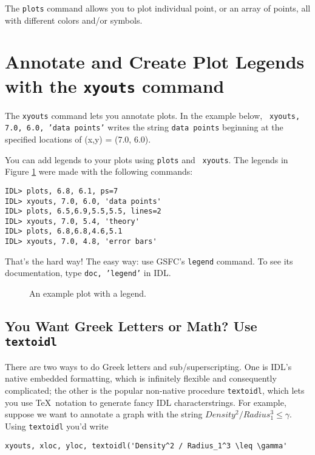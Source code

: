 \documentclass[preprint]{aastex}
\begin{document}
The {\tt plots} command allows you to plot individual point, or an array
of points, all with different colors and/or symbols.

\section{Annotate and Create Plot Legends with the {\tt xyouts} command}

The {\tt xyouts} command lets you annotate plots. In the example below, {\tt
xyouts, 7.0, 6.0, 'data points'} writes the string {\tt data points}
beginning at the specified locations of (x,y) = (7.0, 6.0).

You can add legends to your plots using {\tt plots} and {\tt
xyouts}.  The legends in Figure \ref{ex4} were made with the following
commands:

\begin{verbatim}
IDL> plots, 6.8, 6.1, ps=7
IDL> xyouts, 7.0, 6.0, 'data points'
IDL> plots, 6.5,6.9,5.5,5.5, lines=2
IDL> xyouts, 7.0, 5.4, 'theory'
IDL> plots, 6.8,6.8,4.6,5.1
IDL> xyouts, 7.0, 4.8, 'error bars'
\end{verbatim}

That's the hard way!  The easy way: use GSFC's {\tt legend} command. To
see its documentation, type {\tt doc, 'legend'} in IDL.

\begin{figure}[!ht]
\begin{center}
\leavevmode
{}
\end{center}
\caption{An example plot with a legend.}\label{ex4}
\end{figure}

\subsection{You Want Greek Letters or Math? Use {\tt textoidl}}

        There are two ways to do Greek letters and sub/superscripting.
One is IDL's native embedded formatting, which is infinitely flexible
and consequently complicated; the other is the popular non-native
procedure {\tt textoidl}, which lets you use \TeX\ notation to generate
fancy IDL characterstrings.  For example, suppose we want to annotate a
graph with the string $Density^2 / Radius_1^3 \leq \gamma$.  Using
\verb$textoidl$ you'd write

\begin{verbatim}
xyouts, xloc, yloc, textoidl('Density^2 / Radius_1^3 \leq \gamma'
\end{verbatim}
\end{document}
